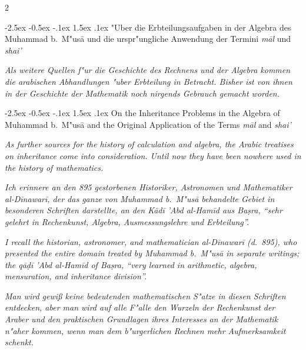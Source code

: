 \documentclass[10pt,a4paper]{article}
\makeatletter
\newcommand{\enquote}[1]{``#1''}
\renewcommand{\section}{\@startsection{section}{1}{\z@}%
  {-2.5ex \@plus -0.5ex \@minus -.1ex}%
  {1.5ex \@plus .1ex}%
  {\normalfont\large\bfseries\color{sectioncolor}}}
\makeatother
\begin{document}
\clearpage

\begin{paracol}{2}

\section{"Uber die Erbteilungsaufgaben in der Algebra des Muhammad b.\ M"us\=a und die urspr"ungliche Anwendung der Termini \textit{m\=al} und \textit{shai'}}

\textit{Als weitere Quellen f"ur die Geschichte des Rechnens und der Algebra kommen die arabischen Abhandlungen "uber Erbteilung in Betracht. Bisher ist von ihnen in der Geschichte der Mathematik noch nirgends Gebrauch gemacht worden.}

\switchcolumn

\section{On the Inheritance Problems in the Algebra of Muhammad b.\ M"us\=a and the Original Application of the Terms \textit{m\=al} and \textit{shai'}}

\textit{As further sources for the history of calculation and algebra, the Arabic treatises on inheritance come into consideration. Until now they have been nowhere used in the history of mathematics.}

\switchcolumn*

\textit{Ich erinnere an den 895 gestorbenen Historiker, Astronomen und Mathematiker al-D\={i}nawar\={i}, der das ganze von Muhammad b.\ M"us\=a behandelte Gebiet in besonderen Schriften darstellte, an den K\=ad\={i} 'Abd al-Ham\={i}d aus Ba\d{s}ra, \enquote{sehr gelehrt in Rechenkunst, Algebra, Ausmessungslehre und Erbteilung}.}

\switchcolumn

\textit{I recall the historian, astronomer, and mathematician al-D\={i}nawar\={i} (d.\ 895), who presented the entire domain treated by Muhammad b.\ M"us\=a in separate writings; the q\=a\d{d}\={i} 'Abd al-Ham\={i}d of Ba\d{s}ra, \enquote{very learned in arithmetic, algebra, mensuration, and inheritance division}.}

\switchcolumn*

\textit{Man wird gewi\ss{} keine bedeutenden mathematischen S"atze in diesen Schriften entdecken, aber man wird auf alle F"alle den Wurzeln der Rechenkunst der Araber und den praktischen Grundlagen ihres Interesses an der Mathematik n"aher kommen, wenn man dem b"urgerlichen Rechnen mehr Aufmerksamkeit schenkt.}


\end{paracol}
\end{document}
